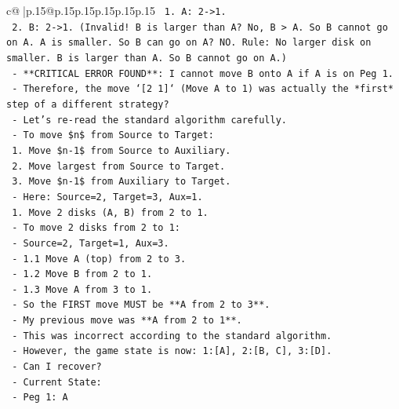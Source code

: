 \documentclass{article}
\begin{document}
{\begin{supertabular}{c@{$\;$}|p{.15\linewidth}@{}p{.15\linewidth}p{.15\linewidth}p{.15\linewidth}p{.15\linewidth}p{.15\linewidth}}
{{{\texttt{             1. A: 2{-}>1.} \\
\texttt{             2. B: 2{-}>1. (Invalid! B is larger than A? No, B > A. So B cannot go on A. A is smaller. So B can go on A? NO. Rule: No larger disk on smaller. B is larger than A. So B cannot go on A.)} \\
\texttt{             {-} **CRITICAL ERROR FOUND**: I cannot move B onto A if A is on Peg 1.} \\
\texttt{             {-} Therefore, the move `{[}2 1{]}` (Move A to 1) was actually the *first* step of a different strategy?} \\
\texttt{             {-} Let's re{-}read the standard algorithm carefully.} \\
\texttt{             {-} To move \$n\$ from Source to Target:} \\
\texttt{               1. Move \$n{-}1\$ from Source to Auxiliary.} \\
\texttt{               2. Move largest from Source to Target.} \\
\texttt{               3. Move \$n{-}1\$ from Auxiliary to Target.} \\
\texttt{             {-} Here: Source=2, Target=3, Aux=1.} \\
\texttt{               1. Move 2 disks (A, B) from 2 to 1.} \\
\texttt{                  {-} To move 2 disks from 2 to 1:} \\
\texttt{                    {-} Source=2, Target=1, Aux=3.} \\
\texttt{                    {-} 1.1 Move A (top) from 2 to 3.} \\
\texttt{                    {-} 1.2 Move B from 2 to 1.} \\
\texttt{                    {-} 1.3 Move A from 3 to 1.} \\
\texttt{               {-} So the FIRST move MUST be **A from 2 to 3**.} \\
\texttt{             {-} My previous move was **A from 2 to 1**.} \\
\texttt{             {-} This was incorrect according to the standard algorithm.} \\
\texttt{             {-} However, the game state is now: 1:{[}A{]}, 2:{[}B, C{]}, 3:{[}D{]}.} \\
\texttt{             {-} Can I recover?} \\
\texttt{             {-} Current State:} \\
\texttt{               {-} Peg 1: A} \\
}}}
\end{supertabular}}
\end{document}
